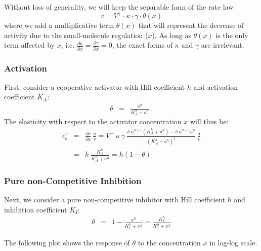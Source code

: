 \documentclass[12pt,a4paper]{article}
\begin{document}
Without loss of generality, we will keep the separable form of the rate law
\[v = V^+ \cdot \kappa \cdot \gamma \cdot \theta(x)\]
where we add a multiplicative term $\theta(x)$ that will represent the decrease of activity due to the small-molecule regulation ($x$). As long as $\theta(x)$ is the only term affected by $x$, i.e. $\frac{\partial \kappa}{\partial x} = \frac{\partial \gamma}{\partial x} = 0$, the exact forms of $\kappa$ and $\gamma$ are irrelevant.

\subsubsection{Activation}
First, consider a cooperative \cite{Barcroft1910-rx, Monod1965-dq} activator with Hill coefficient $h$ and activation coefficient $K_A$:
\begin{eqnarray}
    \theta &=& \frac{a^h}{K_A^h + a^h}~.
\end{eqnarray}
The elasticity with respect to the activator concentration $x$ will thus be:
\begin{eqnarray}
    \epsilon_a^v &=& \frac{\partial v}{\partial a} ~ \frac{a}{v} = V^+ ~ \kappa ~ \gamma ~ \frac{h~a^{h-1} (K_A^h + a^h) - h~a^{h-1} a^h}{(K_A^h + a^h)^2}~\frac{a}{v} \nonumber \\
    &=& h~\frac{K_A^h}{K_A^h + a^h} = h (1 - \theta) \label{eq:eps_act}
\end{eqnarray}

\subsubsection{Pure non-Competitive Inhibition}
Next, we consider a pure non-competitive inhibitor with Hill coefficient $h$ and inhibition coefficient $K_I$:
\begin{eqnarray}
    \theta &=& 1 - \frac{x^h}{K_I^h + x^h} = \frac{K_I^h}{K_I^h + x^h}
\end{eqnarray}

The following plot shows the response of $\theta$ to the concentration $x$ in log-log scale.

\begin{center}
\end{center}
\end{document}
